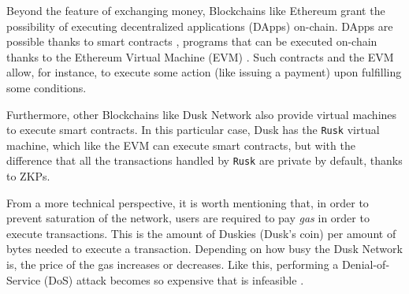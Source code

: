 Beyond the feature of exchanging money, Blockchains like Ethereum \cite{ethereum} grant the possibility of executing decentralized applications (DApps) on-chain. DApps are possible thanks to smart contracts \cite{mavridou2018designing}, programs that can be executed on-chain thanks to the Ethereum Virtual Machine (EVM) \cite{hildenbrandt2018kevm}. Such contracts and the EVM allow, for instance, to execute some action (like issuing a payment) upon fulfilling some conditions.

Furthermore, other Blockchains like Dusk Network \cite{dusk} also provide virtual machines to execute smart contracts. In this particular case, Dusk has the \verb!Rusk! virtual machine, which like the EVM can execute smart contracts, but with the difference that all the transactions handled by \verb!Rusk! are private by default, thanks to ZKPs.

From a more technical perspective, it is worth mentioning that, in order to prevent saturation of the network, users are required to pay \textit{gas} in order to execute transactions. This is the amount of Duskies (Dusk's coin) per amount of bytes needed to execute a transaction. Depending on how busy the Dusk Network is, the price of the gas increases or decreases. Like this, performing a Denial-of-Service (DoS) attack becomes so expensive that is infeasible \cite{Chen2017AnAG}.
